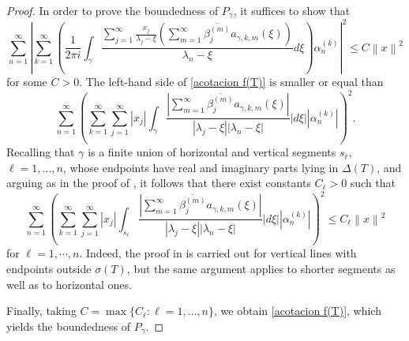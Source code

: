 \documentclass[11pt]{amsart}
\theoremstyle{definition}
\theoremstyle{remark}
\numberwithin{equation}{section}
\newcommand{\norm}[1]{\left\|#1\right\|}
\newcommand{\al}{\alpha}
\newcommand{\sumn}{\sum_{n=1}^{\infty}}
\newcommand{\summ}{\sum_{m=1}^{\infty}}
\newcommand{\sumj}{\sum_{j=1}^\infty}
\begin{document}
\begin{proof}
In order to prove the boundedness of $P_\gamma$, it suffices to show that
		\begin{equation}\label{acotacion f(T)}
			\sumn \left| \sum_{k=1}^\infty \left( \frac{1}{2\pi i} \int_{\gamma}  \frac{ \sumj \frac{x_j}{\lambda_j-\xi}\left(\summ \overline{\beta_j^{(m)}}a_{\gamma,k,m}(\xi)\right)}{\lambda_n-\xi}        d\xi    \right)\al_n^{(k)}\right|^2 \leq C \norm{x}^2
		\end{equation}
		for some $C>0.$ The left-hand side of \eqref{acotacion f(T)} is smaller or equal than
$$ \sumn \left(\sum_{k=1}^\infty  \sumj |x_j| \int_{\gamma} \frac{ \left|\summ \overline{\beta_j^{(m)}}a_{\gamma,k,m}(\xi)\right|}{|\lambda_j-\xi||\lambda_n-\xi|}|d\xi|     \left|\al_n^{(k)}\right|\right)^2.$$
Recalling that $\gamma$ is a finite union of horizontal and vertical segments $s_\ell$, $\ell=1,\ldots,n$, whose endpoints have real and imaginary parts lying in $\Delta(T)$, and arguing as in the proof of \cite[Theorem 4.1]{GG3}, it follows that there exist constants $C_\ell>0$ such that
$$ \sumn \left(\sum_{k=1}^\infty  \sumj |x_j| \int_{s_\ell} \frac{ \left|\summ \overline{\beta_j^{(m)}}a_{\gamma,k,m}(\xi)\right|}{|\lambda_j-\xi||\lambda_n-\xi|}|d\xi|     \left|\al_n^{(k)}\right|\right)^2 \leq C_\ell\norm{x}^2$$ for $\ell=1,\cdots,n.$
Indeed, the proof in \cite{GG3} is carried out for vertical lines with endpoints outside $\sigma(T)$, but the same argument applies to shorter segments as well as to horizontal ones.

\noindent Finally, taking $C=\max\{C_\ell:\ell=1,\ldots,n\}$, we obtain \eqref{acotacion f(T)}, which yields the boundedness of $P_\gamma$.

\smallskip


\end{proof}
\end{document}
